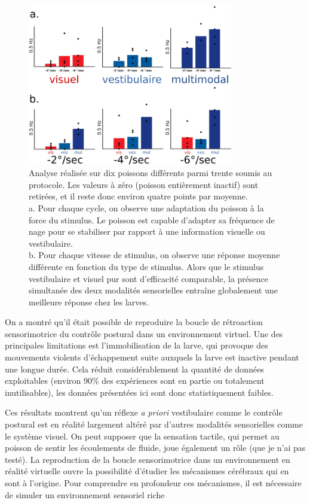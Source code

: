 \begin{figure}
\centering
\includegraphics[width=0.8\textwidth]{./files/stats.svg.png}
\caption{
Analyse réalisée sur dix poissons différents parmi trente soumis au protocole. Les valeurs à zéro (poisson entièrement inactif) sont retirées, et il reste donc environ quatre points par moyenne.
\\
a. Pour chaque cycle, on observe une adaptation du poisson à la force du stimulus. Le poisson est capable d'adapter sa fréquence de nage pour se stabiliser par rapport à une information visuelle ou vestibulaire.
\\
b. Pour chaque vitesse de stimulus, on observe une réponse moyenne différente en fonction du type de stimulus. Alors que le stimulus vestibulaire et visuel pur sont d'efficacité comparable, la présence simultanée des deux modalités sensorielles entraîne globalement une meilleure réponse chez les larves.
}
\end{figure}


On a montré qu'il était possible de reproduire la boucle de rétroaction sensorimotrice du contrôle postural dans un environnement virtuel. Une des principales limitations est l'immobilisation de la larve, qui provoque des mouvements violents d'échappement suite auxquels la larve est inactive pendant une longue durée. Cela réduit considérablement la quantité de données exploitables (environ 90\% des expériences sont en partie ou totalement inutilisables), les données présentées ici sont donc statistiquement faibles.

Ces résultats montrent qu'un réflexe \emph{a priori} vestibulaire comme le contrôle postural est en réalité largement altéré par d'autres modalités sensorielles comme le système visuel. On peut supposer que la sensation tactile, qui permet au poisson de sentir les écoulements de fluide, joue également un rôle (que je n'ai pas testé). La reproduction de la boucle sensorimotrice dans un environnement en réalité virtuelle ouvre la possibilité d'étudier les mécanismes cérébraux qui en sont à l'origine. Pour comprendre en profondeur ces mécanismes, il est nécessaire de simuler un environnement sensoriel riche  

